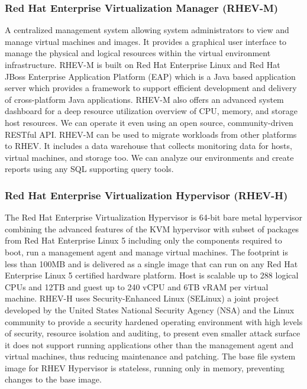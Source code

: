 \begin{enumerate}
\subsubsection{Red Hat Enterprise Virtualization Manager (RHEV-M)}
A centralized management system allowing system administrators to view and manage virtual machines and images. It provides a graphical user interface to manage the physical and logical resources within the virtual environment infrastructure. RHEV-M is built on Red Hat Enterprise Linux and Red Hat JBoss Enterprise Application Platform (EAP) which is a Java based application server which provides a framework to support efficient development and delivery of cross-platform Java applications. RHEV-M also offers an advanced system dashboard for a deep resource utilization overview of CPU, memory, and storage host resources. We can operate it even using an open source, community-driven RESTful API. RHEV-M can be used to migrate workloads from other platforms to RHEV. It includes a data warehouse that collects monitoring data for hosts, virtual machines, and storage too. We can analyze our environments and create reports using any SQL supporting query tools.


\subsubsection{Red Hat Enterprise Virtualization Hypervisor (RHEV-H)}
The Red Hat Enterprise Virtualization Hypervisor is 64-bit bare metal hypervisor combining the advanced features of the KVM hypervisor with subset of packages from Red Hat Enterprise Linux 5 including only the components required to boot, run a management agent and manage virtual machines. The footprint is less than 100MB and is delivered as a single image that can run on any Red Hat Enterprise Linux 5 certified hardware platform. Host is scalable up to 288 logical CPUs and 12TB and guest up to 240 vCPU and 6TB vRAM per virtual machine. RHEV-H uses Security-Enhanced Linux (SELinux) a joint project developed by the United States National Security Agency (NSA) and the Linux community to provide a security hardened operating environment with high levels of security, resource isolation and auditing, to present even smaller attack surface it does not support running applications other than the management agent and virtual machines, thus reducing maintenance and patching. The base file system image for RHEV Hypervisor is stateless, running only in memory, preventing changes to the base image.


\end{enumerate}
